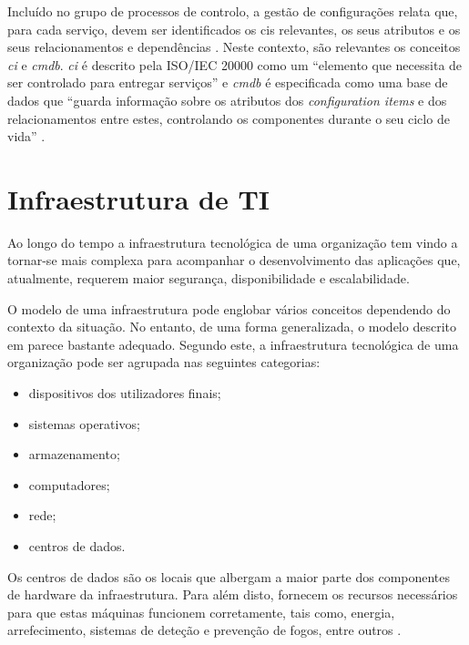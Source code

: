 \documentclass[
  oneside,
  11pt, a4paper,
  footinclude=true,
  headinclude=true,
  cleardoublepage=empty
]{scrbook}
\begin{document}
Incluído no grupo de processos de controlo, a gestão de configurações relata que, para cada serviço, devem ser identificados os \glspl{ci} relevantes, os seus atributos e os seus relacionamentos e dependências \cite{marcelino2018visao}. Neste contexto, são relevantes os conceitos \textit{\acrlong{ci}} e \textit{\acrlong{cmdb}}. \textit{\acrlong{ci}} é descrito pela ISO/IEC 20000 como um ``elemento que necessita de ser controlado para entregar serviços'' e \textit{\acrlong{cmdb}} é especificada como uma base de dados que ``guarda informação sobre os atributos dos \textit{configuration items} e dos relacionamentos entre estes, controlando os componentes durante o seu ciclo de vida'' \cite{iso20000}.

\section{Infraestrutura de TI}

Ao longo do tempo a infraestrutura tecnológica de uma organização tem vindo a tornar-se mais complexa para acompanhar o desenvolvimento das aplicações que, atualmente, requerem maior segurança, disponibilidade e escalabilidade.

O modelo de uma infraestrutura pode englobar vários conceitos dependendo do contexto da situação. No entanto, de uma forma generalizada, o modelo descrito em \cite{infrastructure} parece bastante adequado. Segundo este, a infraestrutura tecnológica de uma organização pode ser agrupada nas seguintes categorias:
\begin{itemize}
    \item dispositivos dos utilizadores finais;
    \item sistemas operativos;
    \item armazenamento;
    \item computadores;
    \item rede;
    \item centros de dados.
\end{itemize}

Os centros de dados são os locais que albergam a maior parte dos componentes de hardware da infraestrutura. Para além disto, fornecem os recursos necessários para que estas máquinas funcionem corretamente, tais como, energia, arrefecimento, sistemas de deteção e prevenção de fogos, entre outros \cite{infrastructure}.
\end{document}
